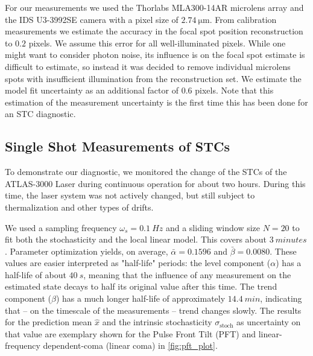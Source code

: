 \documentclass[9pt, twocolumn,superscriptaddress]{revtex4}
\begin{document}
For our measurements we used the Thorlabs MLA300-14AR microlens array and the IDS U3-3992SE camera with a pixel size of $\SI{2.74}{\micro\meter}$. From calibration measurements we estimate the accuracy in the focal spot position reconstruction to $0.2$ pixels. We assume this error for all well-illuminated pixels. While one might want to consider photon noise, its influence is on the focal spot estimate is difficult to estimate, so instead it was decided to remove individual microlens spots with insufficient illumination from the reconstruction set. We estimate the model fit uncertainty as an additional factor of $0.6$ pixels.
Note that this estimation of the measurement uncertainty is the first time this has been done for an STC diagnostic.



\subsection{Single Shot Measurements of STCs}\label{sec:results}
 

To demonstrate our diagnostic, we monitored the change of the STCs of the ATLAS-3000 Laser during continuous operation for about two hours. During this time, the laser system was not actively changed, but still subject to thermalization and other types of drifts.

We used a sampling frequency $\omega_s = \SI{0.1}{Hz}$ and a sliding window size $N=20$ to fit both the stochasticity and the local linear model. This covers about $\SI{3}{minutes}$. Parameter optimization yields, on average, $\bar\alpha=0.1596$ and $\bar\beta=0.0080$. These values are easier interpreted as "half-life" periods: the level component ($\alpha$) has a half-life of about $\SI{40}{s}$, meaning that the influence of any measurement on the estimated state decays to half its original value after this time. The trend component ($\beta$) has a much longer half-life of approximately $\SI{14.4}{min}$, indicating that -- on the timescale of the measurements -- trend changes slowly. The results for the prediction mean $\hat{x}$ and the intrinsic stochasticity $\sigma_\text{stoch}$ as uncertainty on that value are exemplary shown for the Pulse Front Tilt (PFT) and linear-frequency dependent-coma (linear coma) in \cref{fig:pft_plot}. 
\end{document}
